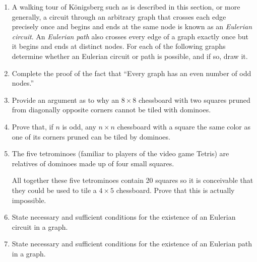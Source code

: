
\begin{enumerate}

\item A walking tour of K\"{o}nigsberg such as is described in this section,
or more generally, a circuit through an arbitrary graph that crosses each
edge precisely once and begins and ends at the same node is known as
an  \emph{Eulerian circuit}.  An  \emph{Eulerian path} also crosses every edge of a graph exactly
once but it begins and ends at distinct nodes.  For each of the following
graphs determine whether an Eulerian circuit or path is possible, and if so,
draw it.

\begin{center}

\end{center}

\begin{center}

\end{center}

\item Complete the proof of the fact that ``Every graph has an even number
of odd nodes.''


\item Provide an argument as to why an $8 \times 8$ chessboard with 
two squares pruned from diagonally opposite corners cannot be tiled
with dominoes.

\item Prove that, if $n$ is odd, any $n \times n$ chessboard with 
a square the same color as one of its corners pruned can be tiled by
dominoes.

\item The five  tetrominoes (familiar to players of the video game
Tetris) are relatives of dominoes made up of four small squares.

\begin{center}

\end{center}

\noindent All together these five tetrominoes contain 20 squares
so it is conceivable that they could be used to tile a $4 \times 5$
chessboard.  Prove that this is actually impossible.

\item State necessary and sufficient conditions for the existence of
an Eulerian circuit in a graph.  

\item  State necessary and sufficient conditions for the existence of
an Eulerian path in a graph.  


\end{enumerate}
